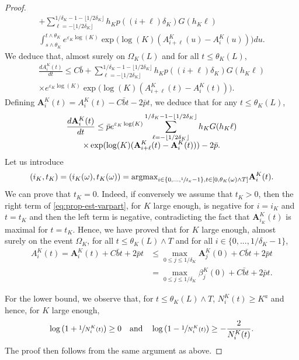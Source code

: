 \documentclass[JEP,XML,SOM,Unicode,published]{cedram}
\theoremstyle{plain}
\theoremstyle{remark}
\begin{document}
\begin{proof}
\begin{multline*}
+ \sum_{\ell=-\lfloor 1/2\delta_K\rfloor}^{1/\delta_K-1-\lfloor 1/2\delta_K\rfloor} h_{K} p((i+\ell) \delta_{K}) G(h_{K}\ell) \\[-2pt] \int_{s\wedge \theta_K }^{t\wedge \theta_K} e^{\varepsilon_K \log(K) } \exp\bigl(\log(K) (A^K_{i+\ell}(u)-A^K_{i}(u))\bigr) du.
\end{multline*}
We deduce that, almost surely on $\Omega_K(L)$ and for all $t\leq\theta_K(L)$,\vspace*{-5pt}
\begin{multline*}
\frac{dA^K_{i}(t)}{dt} \leq C\bar b
+ \sum_{\ell=-\lfloor 1/2\delta_K\rfloor}^{1/\delta_K-1-\lfloor 1/2\delta_K\rfloor} h_{K} p((i+\ell) \delta_{K}) G(h_{K}\ell) \\[-8pt] \times e^{\varepsilon_K\log(K) } \exp\bigl(\log(K) (A^K_{i+\ell}(t)-A^K_{i}(t))\bigr).
\end{multline*}
Defining $\mathbf{A}^K_i(t) = A^K_{i}(t) - C\bar bt - 2 \bar p t$, we deduce that for any $t\leq \theta_K(L)$,\vspace*{-5pt}
\begin{multline}
\label{eq:prop-est-varpart}
{d \mathbf{A}^K_{i}(t)\over dt}\leq \bar p e^{\varepsilon_K\log(K) } \sum_{\ell=-\lfloor 1/2\delta_K\rfloor}^{1/\delta_K-1-\lfloor 1/2\delta_K\rfloor} h_{K} G(h_{K}\ell) \\[-5pt]
\times \exp(\log(K) (\mathbf{A}^K_{i+\ell}(t)- \mathbf{A}^K_{i}(t))) - 2 \bar p.
\end{multline}
Let us introduce
\[(i_{K}, t_{K}) = (i_K(\omega),t_K(\omega))=\text{argmax}_{{i\in \{0,\dots, \sfrac{1}{\delta_{K}}-1\}, t\in [0, \theta_{K}(\omega)\wedge T]}} \mathbf{A}^K_{i}(t).\]
We can prove that $t_{K}=0.$
Indeed, if conversely we assume that $t_{K}>0$, then the right term of \eqref{eq:prop-est-varpart}, for $K$ large enough, is negative for $i=i_{K}$ {and $t=t_K$} and then the
left term is negative, contradicting the fact that $\mathbf{A}^K_{i_K}(t)$ is maximal for $t=t_K$. Hence, we have proved that {for $K$ large enough}, almost surely on
the event $\Omega_K$, for all $t\leq \theta_K(L)\wedge T$ and for all $i \in \{0, . . . , 1/\delta_K - 1 \}$,
\begin{align*}
A^K_i(t)=\mathbf{A}^K_i(t)+C\bar bt + 2 \bar p t&\leq\max_{0\leq j\leq 1/\delta_K}\mathbf{A}^K _j(0)+C\bar b t + 2 \bar p t\\
&= \max_{0\leq j\leq 1/\delta_K} \beta^K _j(0)+C\bar b t + 2 \bar p t.
\end{align*}

For the lower bound, we observe that, for $t\leq \theta_K(L)\wedge T$, $N^K_i(t)\geq K^a$ and hence, for $K$ large enough,
\[
\log\left(1+\sfrac{1}{N^K_i(t)}\right)\geq 0 \quad\text{and}\quad \log\left(1-\sfrac{1}{N^K_i(t)}\right)\geq -\frac{2}{N^K_i(t)}.
\]
The proof then follows from the same argument as above.
\end{proof}
\end{document}
